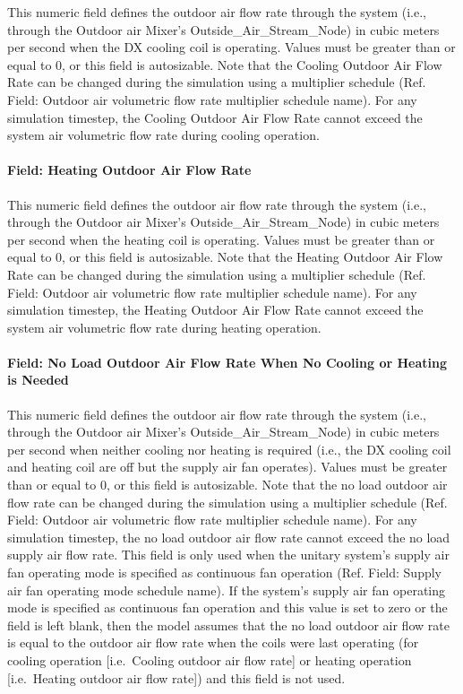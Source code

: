 This numeric field defines the outdoor air flow rate through the system (i.e., through the Outdoor air Mixer's Outside\_Air\_Stream\_Node) in cubic meters per second when the DX cooling coil is operating. Values must be greater than or equal to 0, or this field is autosizable. Note that the Cooling Outdoor Air Flow Rate can be changed during the simulation using a multiplier schedule (Ref. Field: Outdoor air volumetric flow rate multiplier schedule name). For any simulation timestep, the Cooling Outdoor Air Flow Rate cannot exceed the system air volumetric flow rate during cooling operation.

\paragraph{Field: Heating Outdoor Air Flow Rate}\label{field-heating-outdoor-air-flow-rate-000}

This numeric field defines the outdoor air flow rate through the system (i.e., through the Outdoor air Mixer's Outside\_Air\_Stream\_Node) in cubic meters per second when the heating coil is operating. Values must be greater than or equal to 0, or this field is autosizable. Note that the Heating Outdoor Air Flow Rate can be changed during the simulation using a multiplier schedule (Ref. Field: Outdoor air volumetric flow rate multiplier schedule name). For any simulation timestep, the Heating Outdoor Air Flow Rate cannot exceed the system air volumetric flow rate during heating operation.

\paragraph{Field: No Load Outdoor Air Flow Rate When No Cooling or Heating is Needed}\label{field-no-load-outdoor-air-flow-rate-when-no-cooling-or-heating-is-needed}

This numeric field defines the outdoor air flow rate through the system (i.e., through the Outdoor air Mixer's Outside\_Air\_Stream\_Node) in cubic meters per second when neither cooling nor heating is required (i.e., the DX cooling coil and heating coil are off but the supply air fan operates). Values must be greater than or equal to 0, or this field is autosizable. Note that the no load outdoor air flow rate can be changed during the simulation using a multiplier schedule (Ref. Field: Outdoor air volumetric flow rate multiplier schedule name). For any simulation timestep, the no load outdoor air flow rate cannot exceed the no load supply air flow rate. This field is only used when the unitary system's supply air fan operating mode is specified as continuous fan operation (Ref. Field: Supply air fan operating mode schedule name). If the system's supply air fan operating mode is specified as continuous fan operation and this value is set to zero or the field is left blank, then the model assumes that the no load outdoor air flow rate is equal to the outdoor air flow rate when the coils were last operating (for cooling operation {[}i.e.~Cooling outdoor air flow rate{]} or heating operation {[}i.e.~Heating outdoor air flow rate{]}) and this field is not used.

